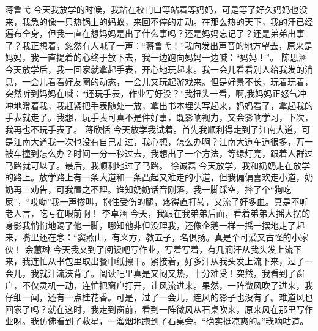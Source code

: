 {}蒋鲁弋\markdownRendererInterblockSeparator
{}今天我放学的时候，我站在校门口等站着等妈妈，可是等了好久妈妈也没来，我急的像一只热锅上的蚂蚁，来回不停的走动。在那么热的天下，我的汗已经遍布全身，但我一直在想妈妈是出了什么事吗？还是妈妈忘记了？还是弟弟出事了？我正想着，忽然有人喊了一声：“蒋鲁弋！”我向发出声音的地方望去，原来是妈妈，我一直提着的心终于放下去，我一边跑向妈妈一边喊：“妈妈！”。\markdownRendererInterblockSeparator
{}\markdownRendererInterblockSeparator
{}陈思涵\markdownRendererInterblockSeparator
{}今天放学后，我一回家就拿起手表，开心地玩起来。我一会儿看看别人给我发的消息，一会儿看看好友圈的动态，一会儿又玩起游戏来。但是好景不长，玩着玩着，突然听到妈妈在喊：“还玩手表，作业写好没？”我扭头一看，啊,我妈妈正怒气冲冲地瞪着我，我赶紧把手表随处一放，拿出书本埋头写起来，妈妈看了，拿起我的手表就走了。我想，玩手表可真不是件好事，既影响视力，又会影响学习，下次，我再也不玩手表了。\markdownRendererInterblockSeparator
{}\markdownRendererInterblockSeparator
{}蒋欣恬\markdownRendererInterblockSeparator
{}今天放学我试着。首先我顺利得走到了江南大道，可是江南大道我一次也没有自己走过，我心想，怎么办啊？江南大道车道很多，万一被车撞到怎么办？时间一分一秒过去，我想出了一个方法，等绿灯亮，跟着人群过马路就可以了。最后，我顺利地过了马路。 \markdownRendererInterblockSeparator
{}\markdownRendererInterblockSeparator
{}徐诚磊\markdownRendererInterblockSeparator
{}今天放学，我和奶奶走在放学的路上。放学路上有一条大道和一条凸起又难走的小道，但我偏偏喜欢走小道，奶奶再三劝告，可我置之不理。谁知奶奶话音刚落，我一脚踩空，摔了个“狗吃屎”，“哎呦”我一声惨叫，抱住受伤的腿，疼得直打转，又流了好多血。真是不听老人言，吃亏在眼前啊！\markdownRendererInterblockSeparator
{}\markdownRendererInterblockSeparator
{}李卓涵\markdownRendererInterblockSeparator
{}今天，我跟在我弟弟后面，看着弟弟大摇大摆的身影我悄悄地踢了他一脚，哪知他非但没理我，还像企鹅一样一摇一摆地走了起来，嘴里还在念：“窦燕山，有义方，教五子，名俱扬。真是个可爱又古怪的小家伙！\markdownRendererInterblockSeparator
{}\markdownRendererInterblockSeparator
{}余蕙琳 \markdownRendererInterblockSeparator
{}今天我又到了阅读吧写作业，写着写着，有几滴汗从我头发上流下来，我连忙从书包里取出餐巾纸擦干。紧接着，好多汗从我头发上流下来，过了一会儿，我就汗流浃背了。阅读吧里真是又闷又热，十分难受！突然，我看到了窗户，不仅灵机一动，连忙把窗户打开，让风流进来。果然，一阵微风吹了进来，我仔细一闻，还有一点桂花香。可是，过了一会儿，连风的影子也没有了。难道风也回家了吗？就在这时，我走到窗前，看到一阵微风从石桌吹来，原来风在那里写作业呀。我仿佛看到了救星，一溜烟地跑到了石桌旁。“确实挺凉爽的。”我嘀咕道。\markdownRendererInterblockSeparator
